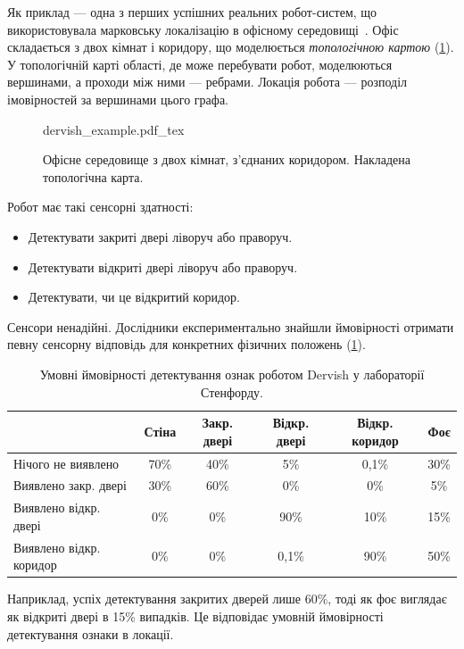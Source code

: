 Як приклад — одна з перших успішних реальних робот-систем, що використовувала марковську локалізацію в офісному середовищі~\cite{nourbakhsh1995dervish}. Офіс складається з двох кімнат і коридору, що моделюється \emph{топологічною картою} (\cref{fig:dervish_example}). У топологічній карті області, де може перебувати робот, моделюються вершинами, а проходи між ними — ребрами. Локація робота — розподіл імовірностей за вершинами цього графа.

\begin{figure}
    \centering
    \def\svgwidth{\textwidth}
    {dervish_example.pdf_tex}
    \caption{Офісне середовище з двох кімнат, з'єднаних коридором. Накладена топологічна карта. \label{fig:dervish_example}}
\end{figure}

Робот має такі сенсорні здатності:
\begin{itemize}
    \item Детектувати закриті двері ліворуч або праворуч.
    \item Детектувати відкриті двері ліворуч або праворуч.
    \item Детектувати, чи це відкритий коридор.
\end{itemize}

Сенсори ненадійні. Дослідники експериментально знайшли ймовірності отримати певну сенсорну відповідь для конкретних фізичних положень (\cref{tab:dervish_example}).

\begin{table}
\footnotesize
\begin{tabular}{lccccc}
 	& Стіна	& Закр. двері & Відкр. двері	& Відкр. коридор & Фоє\\
\hline
Нічого не виявлено	& 70\%	& 40\%&	5\%	& 0{,}1\% & 30\%\\
Виявлено закр. двері & 30\% &	60\%& 0\% &0\%	& 5\%\\
Виявлено відкр. двері & 0\%	& 0\%&	90\% & 10\% & 15\%\\
Виявлено відкр. коридор & 0\% &	 0\%&	0{,}1\% & 90\% &50\%\\
\hline
\end{tabular}
\normalsize
\caption{Умовні ймовірності детектування ознак роботом Dervish у лабораторії Стенфорду.\label{tab:dervish_example}}
\end{table}

Наприклад, успіх детектування закритих дверей лише 60\%, тоді як фоє виглядає як відкриті двері в 15\% випадків. Це відповідає умовній ймовірності детектування ознаки в локації.

